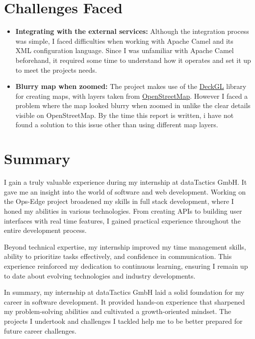 %
%

\section{Challenges Faced}
\label{sec:conclusion:challenges_faced}

\begin{itemize}
    \item \textbf{Integrating with the external services:} Although the integration process was simple, I faced difficulties when working with Apache Camel and its XML configuration language. Since I was unfamiliar with Apache Camel beforehand, it required some time to understand how it operates and set it up to meet the projects needs.
    \item \textbf{Blurry map when zoomed:} The project makes use of the \href{https://deck.gl/}{DeckGL} library for creating maps, with layers taken from \href{https://www.openstreetmap.org/}{OpenStreetMap}. However I faced a problem where the map looked blurry when zoomed in unlike the clear details visible on OpenStreetMap. By the time this report is written, i have not found a solution to this issue other than using different map layers.
\end{itemize}

\section{Summary}
\label{sec:conclusion:summary}

I gain a truly valuable experience during my internship at dataTactics GmbH. It gave me an insight into the world of software and web development. Working on the Ops-Edge project broadened my skills in full stack development, where I honed my abilities in various technologies. From creating APIs to building user interfaces with real time features, I gained practical experience throughout the entire development process.

Beyond technical expertise, my internship improved my time management skills, ability to prioritize tasks effectively, and confidence in communication. This experience reinforced my dedication to continuous learning, ensuring I remain up to date about evolving technologies and industry developments.

In summary, my internship at dataTactics GmbH laid a solid foundation for my career in software development. It provided hands-on experience that sharpened my problem-solving abilities and cultivated a growth-oriented mindset. The projects I undertook and challenges I tackled help me to be better prepared for future career challenges.